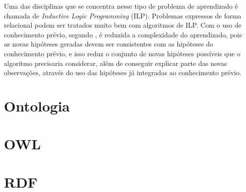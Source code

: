 Uma das disciplinas que se concentra nesse tipo de problema de aprendizado é chamada de \textit{Inductive Logic Programming} (ILP). Problemas expressos de forma relacional podem ser tratados muito bem com algoritmos de ILP. Com o uso de conhecimento prévio, segundo \citet{AIMA}, é reduzida a complexidade do aprendizado, pois as novas hipóteses geradas devem ser consistentes com as hipóteses do conhecimento prévio, e isso reduz o conjunto de novas hipóteses possíveis que o algoritmo precisaria considerar, além de conseguir explicar parte das novas observações, através do uso das hipóteses já integradas ao conhecimento prévio.


\section{Ontologia}
\label{sec:ontologia}


\section{OWL}
\label{sec:owl}


\section{RDF}
\label{sec:rdf}
